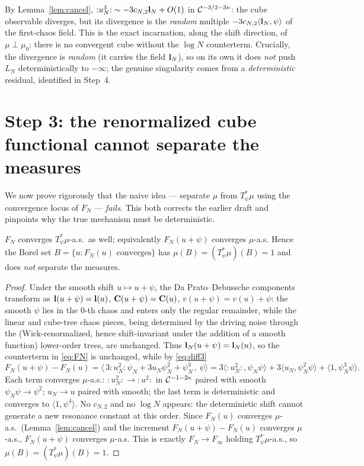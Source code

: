 \begin{remark}
By Lemma~\ref{lem:cancel}, ${:}u_N^3{:}\sim-3c_{N,2}\mathbf{l}_N+O(1)$ in
$\mathcal{C}^{-3/2-3\kappa}$: the cube observable diverges, but its divergence is the
\emph{random} multiple $-3c_{N,2}\langle\mathbf{l}_N,\psi\rangle$ of the first-chaos
field. This is the exact incarnation, along the shift direction, of $\mu\perp\mu_0$:
there is no convergent cube without the $\log N$ counterterm. Crucially, the divergence
is \emph{random} (it carries the field $\mathbf{l}_N$), so on its own it does \emph{not}
push $L_N$ deterministically to $-\infty$; the genuine singularity comes from a
\emph{deterministic} residual, identified in Step~4.
\end{remark}

\section*{Step 3: the renormalized cube functional cannot separate the measures}

We now prove rigorously that the naive idea --- separate $\mu$ from $T_\psi^*\mu$ using
the convergence locus of $F_N$ --- \emph{fails}. This both corrects the earlier draft
and pinpoints why the true mechanism must be deterministic.

\begin{qonelemma}\label{lem:nosep}
$F_N$ converges $T_\psi^*\mu$-a.s.\ as well; equivalently $F_N(u+\psi)$ converges
$\mu$-a.s. Hence the Borel set $B=\{u:F_N(u)\text{ converges}\}$ has
$\mu(B)=(T_\psi^*\mu)(B)=1$ and does \emph{not} separate the measures.
\end{qonelemma}
\begin{proof}
Under the smooth shift $u\mapsto u+\psi$, the Da Prato--Debussche components transform
as $\mathbf{l}(u+\psi)=\mathbf{l}(u)$, $\mathbf{C}(u+\psi)=\mathbf{C}(u)$,
$v(u+\psi)=v(u)+\psi$: the smooth $\psi$ lies in the $0$-th chaos and enters only the
regular remainder, while the linear and cube-tree chaos pieces, being determined by the
driving noise through the (Wick-renormalized, hence shift-invariant under the addition
of a smooth function) lower-order trees, are unchanged. Thus
$\mathbf{l}_N(u+\psi)=\mathbf{l}_N(u)$, so the counterterm in \eqref{eq:FN} is unchanged,
while by \eqref{eq:diff3}
\[
F_N(u+\psi)-F_N(u)=\bigl\langle\,3{:}u_N^2{:}\psi_N+3u_N\psi_N^2+\psi_N^3\,,\,\psi\bigr\rangle
=3\langle{:}u_N^2{:},\psi_N\psi\rangle+3\langle u_N,\psi_N^2\psi\rangle+\langle1,\psi_N^3\psi\rangle .
\]
Each term converges $\mu$-a.s.: ${:}u_N^2{:}\to{:}u^2{:}$ in $\mathcal{C}^{-1-2\kappa}$
paired with smooth $\psi_N\psi\to\psi^2$; $u_N\to u$ paired with smooth; the last term
is deterministic and converges to $\langle1,\psi^4\rangle$. No $c_{N,2}$ and no $\log N$
appears: the deterministic shift cannot generate a new resonance constant at this
order. Since $F_N(u)$ converges $\mu$-a.s.\ (Lemma~\ref{lem:cancel}) and the increment
$F_N(u+\psi)-F_N(u)$ converges $\mu$-a.s., $F_N(u+\psi)$ converges $\mu$-a.s. This is
exactly $F_N\to F_\infty$ holding $T_\psi^*\mu$-a.s., so $\mu(B)=(T_\psi^*\mu)(B)=1$.
\end{proof}

